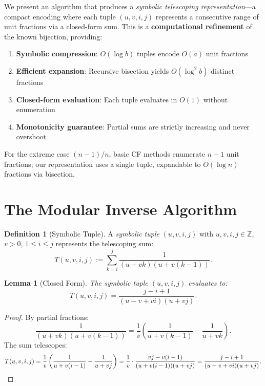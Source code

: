 \documentclass[11pt]{article}
\newtheorem{lemma}[theorem]{Lemma}
\theoremstyle{definition}
\newtheorem{definition}[theorem]{Definition}
\theoremstyle{remark}
\begin{document}
We present an algorithm that produces a \emph{symbolic telescoping representation}---a
compact encoding where each tuple $(u,v,i,j)$ represents a consecutive range of
unit fractions via a closed-form sum. This is a \textbf{computational refinement}
of the known bijection, providing:

\begin{enumerate}
\item \textbf{Symbolic compression}: $O(\log b)$ tuples encode $O(a)$ unit fractions
\item \textbf{Efficient expansion}: Recursive bisection yields $O(\log^2 b)$ distinct fractions
\item \textbf{Closed-form evaluation}: Each tuple evaluates in $O(1)$ without enumeration
\item \textbf{Monotonicity guarantee}: Partial sums are strictly increasing and never overshoot
\end{enumerate}

For the extreme case $(n-1)/n$, basic CF methods enumerate $n-1$ unit fractions;
our representation uses a single tuple, expandable to $O(\log n)$ fractions via bisection.

\section{The Modular Inverse Algorithm}

\begin{definition}[Symbolic Tuple]
A \emph{symbolic tuple} $(u, v, i, j)$ with $u, v, i, j \in \mathbb{Z}$, $v > 0$,
$1 \leq i \leq j$ represents the telescoping sum:
\begin{equation}
T(u, v, i, j) := \sum_{k=i}^{j} \frac{1}{(u + vk)(u + v(k-1))}.
\end{equation}
\end{definition}

\begin{lemma}[Closed Form]\label{lem:closed}
The symbolic tuple $(u, v, i, j)$ evaluates to:
\begin{equation}
T(u, v, i, j) = \frac{j - i + 1}{(u - v + vi)(u + vj)}.
\end{equation}
\end{lemma}

\begin{proof}
By partial fractions:
\[
\frac{1}{(u+vk)(u+v(k-1))} = \frac{1}{v}\left(\frac{1}{u+v(k-1)} - \frac{1}{u+vk}\right).
\]
The sum telescopes:
\[
T(u,v,i,j) = \frac{1}{v}\left(\frac{1}{u+v(i-1)} - \frac{1}{u+vj}\right)
= \frac{1}{v} \cdot \frac{vj - v(i-1)}{(u+v(i-1))(u+vj)}
= \frac{j-i+1}{(u-v+vi)(u+vj)}. \qedhere
\]
\end{proof}
\end{document}
